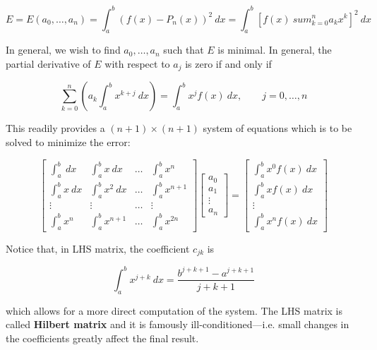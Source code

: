 \documentclass[12pt]{article}
\theoremstyle{definition}
\begin{document}
\begin{equation*}
    E = E(a_0, \ldots, a_n) = \int_a^b \left( f(x) - P_n(x) \right)^2 ~ dx =
    \int_a^b \left[ f(x) \ sum_{k=0}^n a_k x^k \right]^2 ~ dx
\end{equation*}

In general, we wish to find $a_0, \ldots, a_n$ such that $E$ is minimal. In
general, the partial derivative of $E$ with respect to $a_j$ is zero 
if and only if 

\begin{equation*}
    \sum_{k=0}^n \left( a_k \int_a^b x^{k+j} ~ dx \right)  = \int_a^b x^j f(x) ~ dx, \qquad j =
    0, \ldots, n
\end{equation*}

This readily provides a $(n+1) \times (n+1)$ system of equations which is to be solved to minimize
the error:

\begin{equation*}
    \begin{bmatrix} 
        \int_a^b ~ dx & \int_a^b x ~ dx & \ldots & \int_a^b x^{n} \\ 
        \int_a^b x ~ dx & \int_a^b x^2 ~ dx & \ldots & \int_a^b x^{n+1} \\ 
        \vdots & \vdots & \ldots & \vdots \\ 
        \int_a^b x^n & \int_a^b x^{n+1} & \ldots & \int_a^b x^{2n}
    \end{bmatrix} \begin{bmatrix} 
            a_0 \\ a_1 \\ \vdots \\ a_n 
    \end{bmatrix} = \begin{bmatrix} 
            \int_a^b x^0 f(x) ~ dx \\  
            \int_a^b x f(x) ~ dx \\ 
            \vdots \\ 
            \int_a^b x^n f(x) ~ dx
    \end{bmatrix} 
\end{equation*}

Notice that, in LHS matrix, the coefficient $c_{jk}$ is 

\begin{equation*}
    \int_a^b x^{j+k} ~ dx = \frac{b^{j+k+1} - a^{j+k+1}}{j+k+1}
\end{equation*}

which allows for a more direct computation of the system. The LHS matrix is
called \textbf{Hilbert matrix} and it is famously ill-conditioned---i.e. small
changes in the coefficients greatly affect the final result. 
\end{document}
